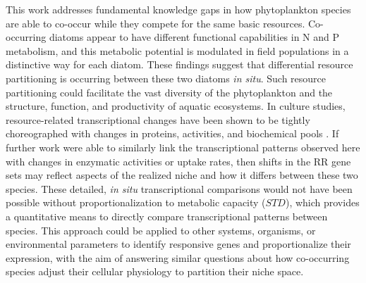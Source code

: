 This work addresses fundamental knowledge gaps in how phytoplankton species are able to co-occur while they compete for the same basic resources. Co-occurring diatoms appear to have different functional capabilities in N and P metabolism, and this metabolic potential is modulated in field populations in a distinctive way for each diatom. These findings suggest that differential resource partitioning is occurring between these two diatoms \textit{in situ}. Such resource partitioning could facilitate the vast diversity of the phytoplankton and the structure, function, and productivity of aquatic ecosystems. In culture studies, resource-related transcriptional changes have been shown to be tightly choreographed with changes in proteins, activities, and biochemical pools \citep{Dyhrman2012, Wurch2011, Bertrand2012a}. If further work were able to similarly link the transcriptional patterns observed here with changes in enzymatic activities or uptake rates, then shifts in the RR gene sets may reflect aspects of the realized niche and how it differs between these two species. These detailed, \textit{in situ} transcriptional comparisons would not have been possible without proportionalization to metabolic capacity ($STD$), which provides a quantitative means to directly compare transcriptional patterns between species. This approach could be applied to other systems, organisms, or environmental parameters to identify responsive genes and proportionalize their expression, with the aim of answering similar questions about how co-occurring species adjust their cellular physiology to partition their niche space.\par

